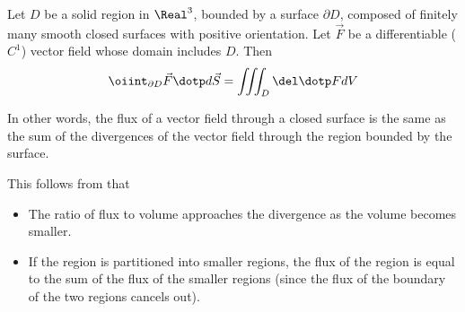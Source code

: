 \begin{namedtheorem}
  Let $D$ be a solid region in $\Real^3$, bounded by a surface $\partial D$, composed of finitely many smooth closed surfaces with positive orientation. Let $\vec{F}$ be a differentiable ($C^1$) vector field whose domain includes $D$. Then
  \[
    \oiint_{\partial D} \vec{F} \dotp d\vec{S} = \iiint_D \del \dotp F dV
  \]

  In other words, the flux of a vector field through a closed surface is the same as the sum of the divergences of the vector field through the region bounded by the surface.

  This follows from that
  \begin{itemize}
    \item The ratio of flux to volume approaches the divergence as the volume becomes smaller.
    \item If the region is partitioned into smaller regions, the flux of the region is equal to the sum of the flux of the smaller regions (since the flux of the boundary of the two regions cancels out). 
  \end{itemize}
\end{namedtheorem}


